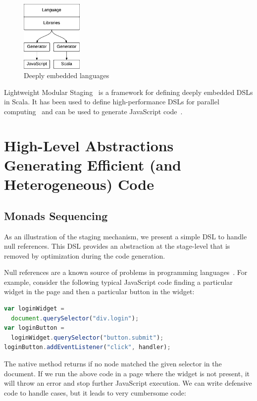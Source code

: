 \documentclass[preprint]{sigplanconf}
\begin{document}
\begin{figure}
  \centering
  \includegraphics[width=3cm]{lms.pdf}
  \caption{Deeply embedded languages}
  \label{dedsl}
\end{figure}

Lightweight Modular Staging~\cite{Rompf12_LMSThesis} is a framework for defining deeply embedded DSLs in Scala. It
has been used to define high-performance DSLs for parallel computing~\cite{Brown11_Parallel} and can be used to
generate JavaScript code~\cite{Kossakowski12_JsDESL}.

\section{High-Level Abstractions Generating Efficient (and Heterogeneous) Code}
\label{contribution}

\subsection{Monads Sequencing}

As an illustration of the staging mechanism, we present a simple DSL to handle null references. This DSL provides an
abstraction at the stage-level that is removed by optimization during the code generation.

Null references are a known source of problems in programming languages~\cite{Hoare09_Null,Nanda09_Null}. For
example, consider the following typical JavaScript code finding a particular widget in the page and then a particular
button in the widget:

\begin{lstlisting}[language=JavaScript,label=null-unsafe,caption=Unsafe code]
var loginWidget =
  document.querySelector("div.login");
var loginButton =
  loginWidget.querySelector("button.submit");
loginButton.addEventListener("click", handler);
\end{lstlisting}

The native  method returns  if no node matched the given selector in the document. If
we run the above code in a page where the widget is not present, it will throw an error and stop further JavaScript
execution. We can write defensive code to handle  cases, but it leads to very cumbersome code:
\end{document}
